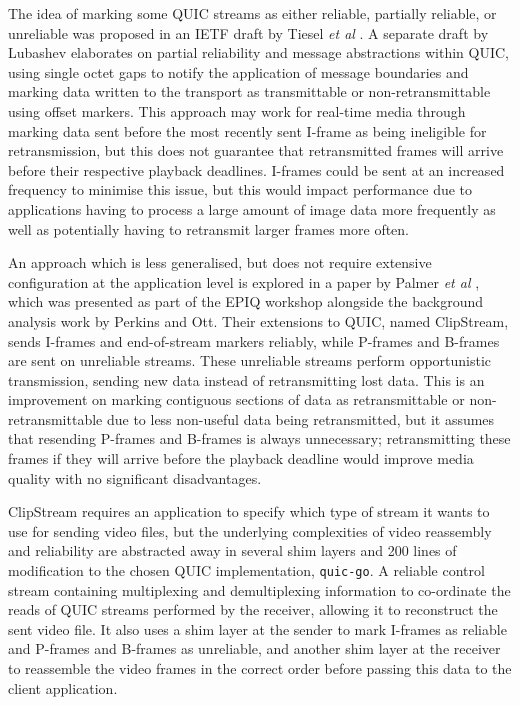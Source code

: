 \documentclass{mprop}
\begin{document}
The idea of marking some QUIC streams as either reliable, partially reliable, or unreliable was proposed in an IETF draft by Tiesel \textit{et al} \cite{Tiesel2017}. A separate draft by Lubashev \cite{Lubashev2018} elaborates on partial reliability and message abstractions within QUIC, using single octet gaps to notify the application of message boundaries and marking data written to the transport as transmittable or non-retransmittable using offset markers. This approach may work for real-time media through marking data sent before the most recently sent I-frame as being ineligible for retransmission, but this does not guarantee that retransmitted frames will arrive before their respective playback deadlines. I-frames could be sent at an increased frequency to minimise this issue, but this would impact performance due to applications having to process a large amount of image data more frequently as well as potentially having to retransmit larger frames more often.

An approach which is less generalised, but does not require extensive configuration at the application level is explored in a paper by Palmer \textit{et al} \cite{Palmer2018}, which was presented as part of the EPIQ workshop alongside the background analysis work by Perkins and Ott. Their extensions to QUIC, named ClipStream, sends I-frames and end-of-stream markers reliably, while P-frames and B-frames are sent on unreliable streams. These unreliable streams perform opportunistic transmission, sending new data instead of retransmitting lost data. This is an improvement on marking contiguous sections of data as retransmittable or non-retransmittable due to less non-useful data being retransmitted, but it assumes that resending P-frames and B-frames is always unnecessary; retransmitting these frames if they will arrive before the playback deadline would improve media quality with no significant disadvantages.

ClipStream requires an application to specify which type of stream it wants to use for sending video files, but the underlying complexities of video reassembly and reliability are abstracted away in several shim layers and 200 lines of modification to the chosen QUIC implementation, \texttt{quic-go}. A reliable control stream containing multiplexing and demultiplexing information to co-ordinate the reads of QUIC streams performed by the receiver, allowing it to reconstruct the sent video file. It also uses a shim layer at the sender to mark I-frames as reliable and P-frames and B-frames as unreliable, and another shim layer at the receiver to reassemble the video frames in the correct order before passing this data to the client application.
\end{document}
